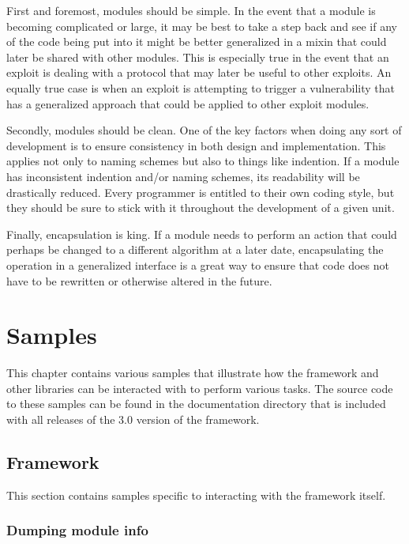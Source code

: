 \documentclass{report}
\begin{document}
\par
First and foremost, modules should be simple.  In the event that a
module is becoming complicated or large, it may be best to take a
step back and see if any of the code being put into it might be
better generalized in a mixin that could later be shared with other
modules.  This is especially true in the event that an exploit is
dealing with a protocol that may later be useful to other exploits.
An equally true case is when an exploit is attempting to trigger a
vulnerability that has a generalized approach that could be applied
to other exploit modules.

\par
Secondly, modules should be clean.  One of the key factors when
doing any sort of development is to ensure consistency in both
design and implementation.  This applies not only to naming schemes
but also to things like indention.  If a module has inconsistent
indention and/or naming schemes, its readability will be drastically
reduced.  Every programmer is entitled to their own coding style,
but they should be sure to stick with it throughout the development
of a given unit.

\par
Finally, encapsulation is king.  If a module needs to perform an
action that could perhaps be changed to a different algorithm at a
later date, encapsulating the operation in a generalized interface
is a great way to ensure that code does not have to be rewritten or
otherwise altered in the future.

\appendix
\chapter{Samples}

\par
This chapter contains various samples that illustrate how the
framework and other libraries can be interacted with to perform
various tasks.  The source code to these samples can be found in the
documentation directory that is included with all releases of the
3.0 version of the framework.

    \section{Framework}

\par
This section contains samples specific to interacting with the
framework itself.

        \subsection{Dumping module info}
\end{document}
